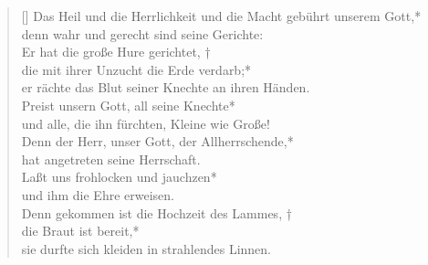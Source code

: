 \begin{verse}[\versewidth]
 Das Heil und die Herrlichkeit und die Macht
gebührt unserem Gott,*\\
denn wahr und gerecht sind seine Gerichte:\\
\vin Er hat die große Hure gerichtet, †\\
\vin die mit ihrer Unzucht die Erde verdarb;*\\
\vin er rächte das Blut seiner Knechte an ihren Händen.\\
Preist unsern Gott, all seine Knechte*\\
und alle, die ihn fürchten, Kleine wie Große!\\
\vin Denn der Herr, unser Gott, der Allherrschende,*\\
\vin hat angetreten seine Herrschaft.\\
Laßt uns frohlocken und jauchzen*\\
und ihm die Ehre erweisen.\\
\vin Denn gekommen ist die Hochzeit des Lammes, †\\
\vin die Braut ist bereit,*\\
\vin sie durfte sich kleiden in strahlendes Linnen.\\
\end{verse}
\vspace{0.6cm}


\resp



\vspace{0.3cm}



\def\greinitialformat#1{{\fontsize{40}{40}\selectfont #1}}
\gresetfirstlineaboveinitial{\small \textcolor{red}{hieme}}{}
\setaboveinitialseparation{0.72mm}

\vspace{0.3cm}

